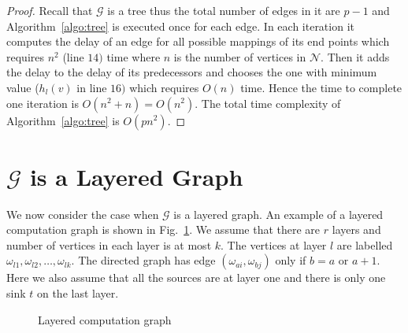 \documentclass[journal]{IEEEtran}
\newcommand{\net}{\mathcal{N}}
\newcommand{\compgraph}{\mathcal{G}}
\begin{document}
\begin{proof}
  Recall that $\compgraph$ is a tree thus the total number of edges in
  it are $p-1$ and Algorithm~\ref{algo:tree} is executed once for each
  edge. In each iteration it computes the delay of an edge for all
  possible mappings of its end points which requires $n^2$ (line $14)$
  time where $n$ is the number of vertices in $\net.$ Then it adds the
  delay to the delay of its predecessors and chooses the one with
  minimum value ($h_{l}(v)$ in line $16)$ which requires $O(n)$
  time. Hence the time to complete one iteration is $O(n^2+n) =
  O(n^2).$ The total time complexity of Algorithm~\ref{algo:tree} is
  $O(pn^2).$
\end{proof}

\section{$\compgraph$ is a Layered Graph}
\label{sec:layered-graph}

We now consider the case when $\compgraph$ is a layered graph.  An
example of a layered computation graph is shown in
Fig.~\ref{fig:layered}. We assume that there are $r$ layers and number
of vertices in each layer is at most $k.$ The vertices at layer $l$
are labelled $\omega_{l1},\omega_{l2},\ldots,\omega_{lk}.$ The
directed graph has edge $(\omega_{ai},\omega_{bj})$ only if $b=a
\mbox{ or } a+1.$ Here we also assume that all the sources are at
layer one and there is only one sink $t$ on the last layer.
\begin{figure}[tbp]
  \centering
{}
  \caption{Layered computation graph}
  \label{fig:layered}
\end{figure}  
\end{document}
